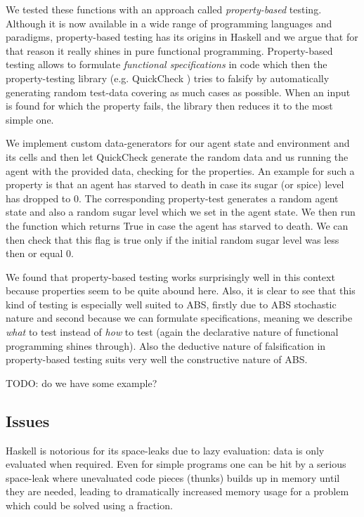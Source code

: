 We tested these functions with an approach called \textit{property-based} testing. Although it is now available in a wide range of programming languages and paradigms, property-based testing has its origins in Haskell \cite{claessen_quickcheck_2000,claessen_testing_2002} and we argue that for that reason it really shines in pure functional programming. Property-based testing allows to formulate \textit{functional specifications} in code which then the property-testing library (e.g. QuickCheck \cite{claessen_quickcheck_2000}) tries to falsify by automatically generating random test-data covering as much cases as possible. When an input is found for which the property fails, the library then reduces it to the most simple one. %

We implement custom data-generators for our agent state and environment and its cells and then let QuickCheck generate the random data and us running the agent with the provided data, checking for the properties. An example for such a property is that an agent has starved to death in case its sugar (or spice) level has dropped to 0. The corresponding property-test generates a random agent state and also a random sugar level which we set in the agent state. We then run the function which returns True in case the agent has starved to death. We can then check that this flag is true only if the initial random sugar level was less then or equal 0.

We found that property-based testing works surprisingly well in this context because properties seem to be quite abound here. Also, it is clear to see that this kind of testing is especially well suited to ABS, firstly due to ABS stochastic nature and second because we can formulate specifications, meaning we describe \textit{what} to test instead of \textit{how} to test (again the declarative nature of functional programming shines through). Also the deductive nature of falsification in property-based testing suits very well the constructive nature of ABS.

TODO: do we have some example?

\subsection{Issues}
Haskell is notorious for its space-leaks due to lazy evaluation: data is only evaluated when required. Even for simple programs one can be hit by a serious space-leak where unevaluated code pieces (thunks) builds up in memory until they are needed, leading to dramatically increased memory usage for a problem which could be solved using a fraction.

